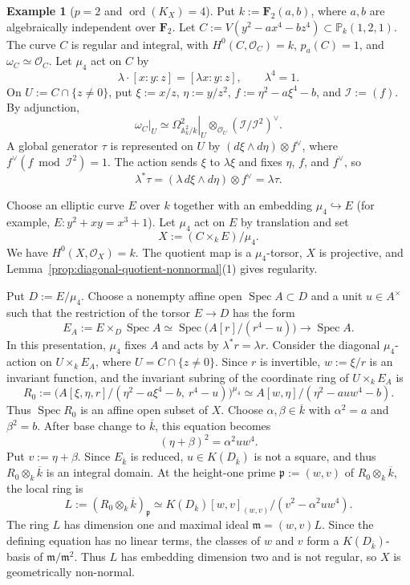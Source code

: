 \documentclass[10pt,abstract=true]{scrartcl}
\numberwithin{equation}{section}
\theoremstyle{definition}
\newtheorem{example}[theorem]{Example}
\theoremstyle{remark}
\DeclareMathOperator\ord{ord}
\begin{document}
\begin{example}[$p=2$ and $\ord(K_X)=4$]\label{ex:caseB-char2-order4}%
  Put $k:=\mathbf F_2(a,b)$, where $a,b$ are algebraically independent over $\mathbf F_2$.
  Let $C:=V(y^2-ax^4-bz^4)\subset\mathbb P_k(1,2,1)$.
  The curve $C$ is regular and integral, with $H^0(C,\mathcal O_C)=k$, $p_a(C)=1$, and $\omega_C\simeq\mathcal O_C$.
  Let $\mu_4$ act on $C$ by
  \[
    \lambda\cdot[x:y:z]=[\lambda x:y:z],
    \qquad \lambda^4=1.
  \]
  On $U:=C\cap\{z\ne0\}$, put $\xi:=x/z$, $\eta:=y/z^2$, $f:=\eta^2-a\xi^4-b$, and $\mathcal I:=(f)$.
  By adjunction,
  \[
    \omega_C|_U\simeq
    \left.\Omega^2_{\mathbb A^2_k/k}\right|_U
    \otimes_{\mathcal O_U}(\mathcal I/\mathcal I^2)^\vee.
  \]
  A global generator $\tau$ is represented on $U$ by $(d\xi\wedge d\eta)\otimes f^\vee$, where $f^\vee(f\bmod\mathcal I^2)=1$.
  The action sends $\xi$ to $\lambda\xi$ and fixes $\eta$, $f$, and $f^\vee$, so
  \[
    \lambda^*\tau
    =(\lambda\,d\xi\wedge d\eta)\otimes f^\vee
    =\lambda\tau.
  \]

  Choose an elliptic curve $E$ over $k$ together with an embedding $\mu_4\hookrightarrow E$ (for example, $E\colon y^2+xy=x^3+1$).
  Let $\mu_4$ act on $E$ by translation and set
  \[
    X:=(C\times_kE)/\mu_4.
  \]
  We have $H^0(X,\mathcal O_X)=k$.
  The quotient map is a $\mu_4$-torsor, $X$ is projective, and Lemma~\ref{prop:diagonal-quotient-nonnormal}\textup{(1)} gives regularity.

  Put $D:=E/\mu_4$.
  Choose a nonempty affine open $\operatorname{Spec}A\subset D$ and a unit $u\in A^\times$ such that the restriction of the torsor $E\to D$ has the form
  \[
    E_A:=E\times_D\operatorname{Spec}A
    \simeq\operatorname{Spec}\bigl(A[r]/(r^4-u)\bigr)
    \longrightarrow\operatorname{Spec}A.
  \]
  In this presentation, $\mu_4$ fixes $A$ and acts by $\lambda^*r=\lambda r$.
  Consider the diagonal $\mu_4$-action on $U\times_k E_A$, where $U=C\cap\{z\ne0\}$.
  Since $r$ is invertible, $w:=\xi/r$ is an invariant function, and the invariant subring of the coordinate ring of $U\times_k E_A$ is
  \[
      R_0:=\bigl(A[\xi,\eta,r]/(\eta^2-a\xi^4-b,\ r^4-u)\bigr)^{\mu_4} 
      \simeq A[w,\eta]/(\eta^2-auw^4-b).
  \]
  Thus $\operatorname{Spec}R_0$ is an affine open subset of $X$.
  Choose $\alpha,\beta\in\overline{k}$ with $\alpha^2=a$ and $\beta^2=b$.
  After base change to $\overline{k}$, this equation becomes
  \[
    (\eta+\beta)^2=\alpha^2u w^4.
  \]
  Put $v:=\eta+\beta$.
  Since $E_{\overline{k}}$ is reduced, $u\in K(D_{\overline{k}})$ is not a square, and thus $R_0\otimes_k\overline{k}$ is an integral domain.
  At the height-one prime $\mathfrak p:=(w,v)$ of $R_0\otimes_k\overline{k}$, the local ring is
  \[
    L:=(R_0\otimes_k\overline{k})_{\mathfrak p}
    \simeq K(D_{\overline{k}})[w,v]_{(w,v)}/(v^2-\alpha^2u w^4).
  \]
  The ring $L$ has dimension one and maximal ideal $\mathfrak m=(w,v)L$.
  Since the defining equation has no linear terms, the classes of $w$ and $v$ form a $K(D_{\overline{k}})$-basis of $\mathfrak m/\mathfrak m^2$.
  Thus $L$ has embedding dimension two and is not regular, so $X$ is geometrically non-normal.


\end{example}
\end{document}
